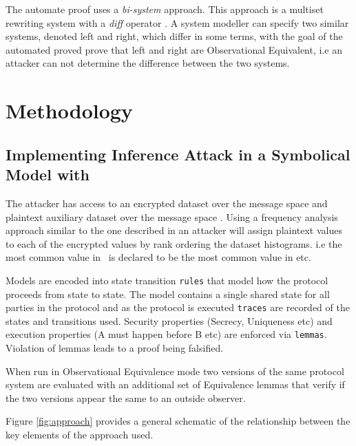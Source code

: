 \documentclass[journal]{IEEEtran}
\begin{document}
The automate proof uses a \textit{bi-system} approach. This approach is a multiset rewriting system with a \textit{diff} operator \cite{AutomatedObsEqv18}.  A system modeller can specify two similar systems, denoted left and right, which differ in some terms, with the goal of the automated proved prove that left and right are Observational Equivalent, i.e an attacker can not determine the difference between the two systems.
\section{Methodology}
\subsection{Implementing Inference Attack in a Symbolical Model with \tamarin{}}
The attacker has access to an encrypted dataset \enc{} over the message space \encSpace{} and plaintext auxiliary dataset \aux{} over the message space \auxSpace. Using a frequency analysis approach similar to the one described in \cite{InfrenceAttacks} an attacker will assign plaintext values to each of the encrypted values by rank ordering the dataset histograms. i.e the most common value in \enc{}\ is declared to be the most common value in \aux{} etc.

Models are encoded into state transition \texttt{rules} that model how the protocol proceeds from state to state. The model contains a single shared state for all parties in the protocol and as the protocol is executed \texttt{traces} are recorded of the states and transitions used. Security properties (Secrecy, Uniqueness etc) and execution properties (A must happen before B etc) are enforced via \texttt{lemmas}. Violation of lemmas leads to a proof being falsified.

When run in Observational Equivalence mode two versions of the same protocol system are evaluated with an additional set of Equivalence lemmas that verify if the two versions appear the same to an outside observer.

Figure \ref{fig:approach} provides a general schematic of the relationship between the key elements of the approach used.
\end{document}
